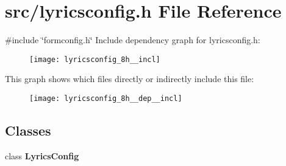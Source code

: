 \section{src/lyricsconfig.h File Reference}
\label{lyricsconfig_8h}
{\ttfamily \#include \char`\"{}formconfig.\+h\char`\"{}}\newline
Include dependency graph for lyricsconfig.\+h\+:\nopagebreak
\begin{figure}[H]
\begin{center}
\leavevmode
\texttt{[image: lyricsconfig\_8h\_\_incl]}
\end{center}
\end{figure}
This graph shows which files directly or indirectly include this file\+:\nopagebreak
\begin{figure}[H]
\begin{center}
\leavevmode
\texttt{[image: lyricsconfig\_8h\_\_dep\_\_incl]}
\end{center}
\end{figure}
\subsection*{Classes}
\begin{DoxyCompactItemize}
\item 
class \textbf{ Lyrics\+Config}
\end{DoxyCompactItemize}
